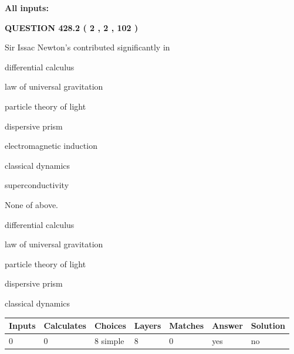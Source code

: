 \documentclass[12pt]{article}
\begin{document}
   
   
   
\noindent{}
   
   
   
   
\noindent\vspace{0.1in}\hspace{-0.08in} {\textbf{\Large{All inputs: }}}
   
   
  
\vspace{0.2in}
  
{\textbf{\Large{QUESTION
428.2 
 ( 2 , 2 , 102 )
}}}
  
  
Sir Issac Newton's contributed significantly in
 
 
differential calculus
 
 
law of universal gravitation
 
 
particle theory of light
 
 
dispersive prism
 
 
electromagnetic induction
 
 
classical dynamics
 
 
superconductivity
 
 
 None of above.
 
 
\noindent{}
 
 
differential calculus
 
 
law of universal gravitation
 
 
particle theory of light
 
 
dispersive prism
 
 
classical dynamics
 
 
\noindent{}
 
 
   
   
   
   
\noindent\begin{tabular}{|l|l|l|l|l|l|l|}
 \hline
Inputs & Calculates & Choices & Layers & Matches & Answer & Solution \\ \hline
 0  & 
 0  & 
 8
  simple  
  & 
 8  & 
 0  & 
  yes & 
  no 
  \\ \hline
 \end{tabular}
   
\end{document}
